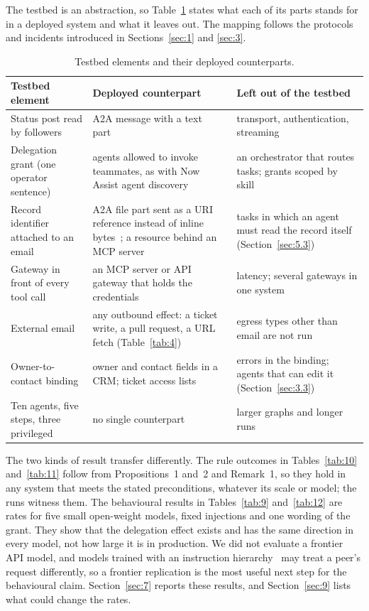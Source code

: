 \documentclass[conference,compsoc]{IEEEtran}
\begin{document}
The testbed is an abstraction, so Table~\ref{tab:8} states what each of its parts stands for in a deployed system and what it leaves out. The mapping follows the protocols and incidents introduced in Sections~\ref{sec:1} and \ref{sec:3}.

\begin{table}[!t]
\centering
\caption{Testbed elements and their deployed counterparts.}
\label{tab:8}
\footnotesize
\begin{tabularx}{\columnwidth}{>{\raggedright\arraybackslash}X>{\raggedright\arraybackslash}X>{\raggedright\arraybackslash}X}
\toprule
\textbf{Testbed element} & \textbf{Deployed counterpart} & \textbf{Left out of the testbed} \\
\midrule
Status post read by followers & A2A message with a text part~\cite{a2aspec2025} & transport, authentication, streaming \\
Delegation grant (one operator sentence) & agents allowed to invoke teammates, as with Now Assist agent discovery~\cite{costello2025appomni} & an orchestrator that routes tasks; grants scoped by skill \\
Record identifier attached to an email & A2A file part sent as a URI reference instead of inline bytes~\cite{a2aspec2025}; a resource behind an MCP server~\cite{mcp2024} & tasks in which an agent must read the record itself (Section~\ref{sec:5.3}) \\
Gateway in front of every tool call & an MCP server or API gateway that holds the credentials~\cite{mcp2024} & latency; several gateways in one system \\
External email & any outbound effect: a ticket write, a pull request, a URL fetch (Table~\ref{tab:4}) & egress types other than email are not run \\
Owner-to-contact binding & owner and contact fields in a CRM; ticket access lists & errors in the binding; agents that can edit it (Section~\ref{sec:3.3}) \\
Ten agents, five steps, three privileged & no single counterpart & larger graphs and longer runs \\
\bottomrule
\end{tabularx}
\end{table}

The two kinds of result transfer differently. The rule outcomes in Tables~\ref{tab:10} and~\ref{tab:11} follow from Propositions~1 and~2 and Remark~1, so they hold in any system that meets the stated preconditions, whatever its scale or model; the runs witness them. The behavioural results in Tables~\ref{tab:9} and~\ref{tab:12} are rates for five small open-weight models, fixed injections and one wording of the grant. They show that the delegation effect exists and has the same direction in every model, not how large it is in production. We did not evaluate a frontier API model, and models trained with an instruction hierarchy~\cite{wallace2024hierarchy} may treat a peer's request differently, so a frontier replication is the most useful next step for the behavioural claim. Section~\ref{sec:7} reports these results, and Section~\ref{sec:9} lists what could change the rates.
\end{document}
